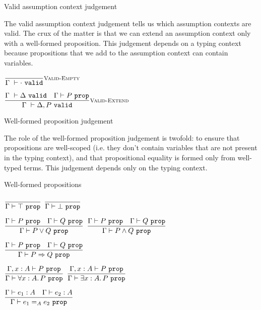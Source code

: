 \documentclass{beamer}
\begin{document}
\begin{frame}{Valid assumption context judgement}

The valid assumption context judgement tells us which assumption contexts are valid. The crux of the matter is that we can extend an assumption context only with a well-formed proposition. This judgement depends on a typing context because propositions that we add to the assumption context can contain variables.

\vspace{2em}

\begin{center}
  $\infrule[Valid-Empty]{}{\assctx{\emptyassctx}}$

  \vspace{2em}

  $\infrule[Valid-Extend]{\assctx{\Delta} \quad \prop[\Gamma]{P}}{\assctx{\assume{\Delta}{P}}}$
\end{center}

\end{frame}

\begin{frame}{Well-formed proposition judgement}

The role of the well-formed proposition judgement is twofold: to ensure that propositions are well-scoped (i.e. they don't contain variables that are not present in the typing context), and that propositional equality is formed only from well-typed terms. This judgement depends only on the typing context.

\end{frame}

\begin{frame}{Well-formed propositions}

\begin{center}
  $\infrule{}{\prop{\True}}$ \quad
  $\infrule{}{\prop{\False}}$

  \vspace{2em}

  $\infrule{\prop{P} \quad \prop{Q}}{\prop{\Or{P}{Q}}}$ \quad
  $\infrule{\prop{P} \quad \prop{Q}}{\prop{\And{P}{Q}}}$

  \vspace{2em}

  $\infrule{\prop{P} \quad \prop{Q}}{\prop{\Impl{P}{Q}}}$

  \vspace{2em}

  $\infrule{\prop[\extend{\Gamma}{x}{A}]{P}}{\prop{\All{x}[A]{P}}}$ \quad
  $\infrule{\prop[\extend{\Gamma}{x}{A}]{P}}{\prop{\Ex{x}[A]{P}}}$

  \vspace{2em}

  $\infrule{\typing{e_1}{A} \quad \typing{e_2}{A}}{\prop{\Eq[A]{e_1}{e_2}}}$
\end{center}

\end{frame}
\end{document}
